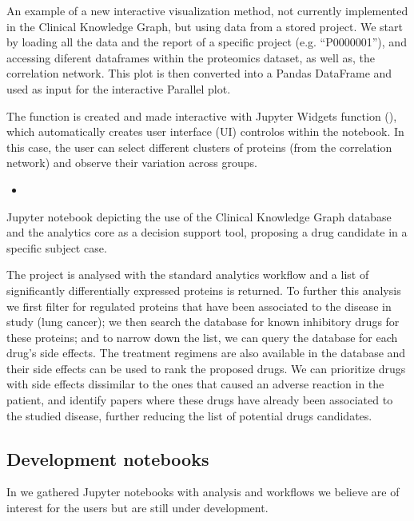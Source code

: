 \documentclass[letterpaper,10pt,english]{sphinxmanual}
\begin{document}
An example of a new interactive visualization method, not currently implemented in the Clinical Knowledge Graph, but using data from a stored project. We start by loading all the data and the report of a specific project (e.g. “P0000001”), and accessing diferent dataframes within the proteomics dataset, as well as, the correlation network. This plot is then converted into a Pandas DataFrame and used as input for the interactive Parallel plot.

The function is created and made interactive with Jupyter Widgets  function (), which automatically creates user interface (UI) controlos within the notebook. In this case, the user can select different clusters of proteins (from the correlation network) and observe their variation across groups.
\begin{itemize}
\item {} 

\end{itemize}

Jupyter notebook depicting the use of the Clinical Knowledge Graph database and the analytics core as a decision support tool, proposing a drug candidate in a specific subject case.

The project is analysed with the standard analytics workflow and a list of significantly differentially expressed proteins is returned. To further this analysis we first filter for regulated proteins that have been associated to the disease in study (lung cancer); we then search the database for known inhibitory drugs for these proteins; and to narrow down the list, we can query the database for each drug’s side effects. The treatment regimens are also available in the database and their side effects can be used to rank the proposed drugs. We can prioritize drugs with side effects dissimilar to the ones that caused an adverse reaction in the patient, and identify papers where these drugs have already been associated to the studied disease, further reducing the list of potential drugs candidates.


\subsection{Development notebooks}
\label{\detokenize{advanced_features/ckg-notebooks:development-notebooks}}
In  we gathered Jupyter notebooks with analysis and workflows we believe are of interest for the users but are still under development.
\end{document}
